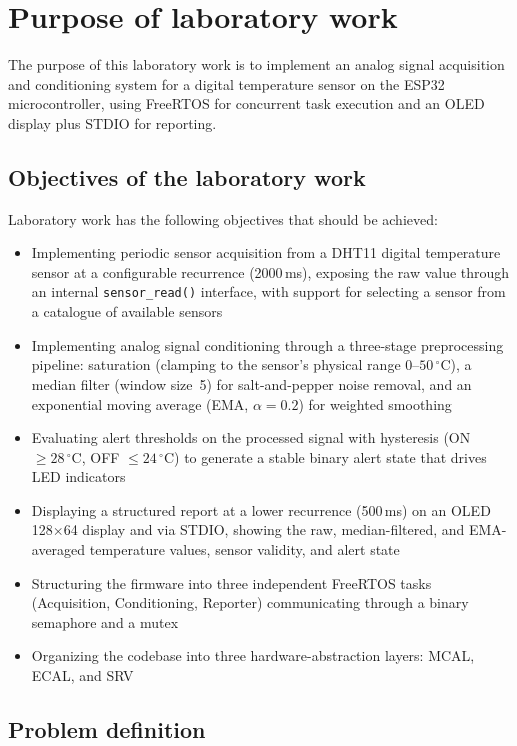 \section{Purpose of laboratory work}

The purpose of this laboratory work is to implement an analog signal acquisition and
conditioning system for a digital temperature sensor on the ESP32 microcontroller,
using FreeRTOS for concurrent task execution and an OLED display plus STDIO for reporting.

\subsection{Objectives of the laboratory work}

Laboratory work has the following objectives that should be achieved:

\begin{itemize}
  \item Implementing periodic sensor acquisition from a DHT11 digital temperature
    sensor at a configurable recurrence (2000\,ms), exposing
    the raw value through an internal \texttt{sensor\_read()} interface, with
    support for selecting a sensor from a catalogue of available sensors
  \item Implementing analog signal conditioning through a three-stage preprocessing
    pipeline: saturation (clamping to the sensor's physical range $0$--$50\,^\circ$C),
    a median filter (window size~5) for salt-and-pepper noise removal, and an
    exponential moving average (EMA, $\alpha = 0.2$) for weighted smoothing
  \item Evaluating alert thresholds on the processed signal with hysteresis
    (ON $\geq 28\,^\circ$C, OFF $\leq 24\,^\circ$C) to generate a stable binary
    alert state that drives LED indicators
  \item Displaying a structured report at a lower recurrence (500\,ms) on an OLED
    128$\times$64 display and via STDIO, showing the raw, median-filtered, and
    EMA-averaged temperature values, sensor validity, and alert state
  \item Structuring the firmware into three independent FreeRTOS tasks (Acquisition,
    Conditioning, Reporter) communicating through a binary semaphore and a mutex
  \item Organizing the codebase into three hardware-abstraction layers: MCAL, ECAL, and SRV
\end{itemize}

\subsection{Problem definition}

